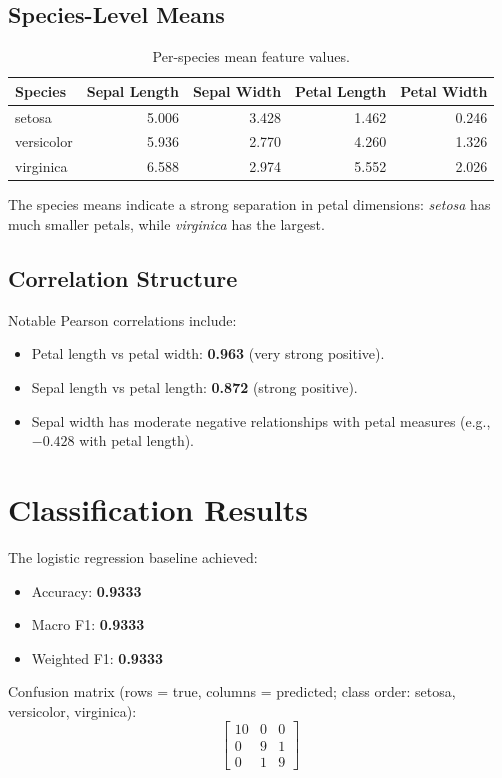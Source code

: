 \documentclass[11pt]{article}
\begin{document}
\subsection{Species-Level Means}
\begin{table}[H]
\centering
\begin{tabular}{lrrrr}
\toprule
Species & Sepal Length & Sepal Width & Petal Length & Petal Width \\
\midrule
setosa & 5.006 & 3.428 & 1.462 & 0.246 \\
versicolor & 5.936 & 2.770 & 4.260 & 1.326 \\
virginica & 6.588 & 2.974 & 5.552 & 2.026 \\
\bottomrule
\end{tabular}
\caption{Per-species mean feature values.}
\end{table}

The species means indicate a strong separation in petal dimensions:
\emph{setosa} has much smaller petals, while \emph{virginica} has the largest.

\subsection{Correlation Structure}
Notable Pearson correlations include:
\begin{itemize}
    \item Petal length vs petal width: \textbf{0.963} (very strong positive).
    \item Sepal length vs petal length: \textbf{0.872} (strong positive).
    \item Sepal width has moderate negative relationships with petal measures (e.g., $-0.428$ with petal length).
\end{itemize}

\section{Classification Results}
The logistic regression baseline achieved:
\begin{itemize}
    \item Accuracy: \textbf{0.9333}
    \item Macro F1: \textbf{0.9333}
    \item Weighted F1: \textbf{0.9333}
\end{itemize}

Confusion matrix (rows = true, columns = predicted; class order: setosa, versicolor, virginica):
\[
\begin{bmatrix}
10 & 0 & 0 \\
0 & 9 & 1 \\
0 & 1 & 9
\end{bmatrix}
\]
\end{document}
